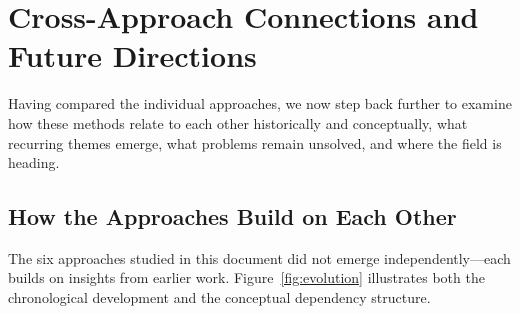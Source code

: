 \chapter{Cross-Approach Connections and Future Directions}
\label{ch:future}

\begin{motivation}
    Having compared the individual approaches, we now step back further
    to examine how these methods relate to each other historically and
    conceptually, what recurring themes emerge, what problems remain
    unsolved, and where the field is heading.
\end{motivation}

\section{How the Approaches Build on Each Other}
\label{sec:evolution}

The six approaches studied in this document did not emerge independently---each
builds on insights from earlier work.
Figure~\ref{fig:evolution} illustrates both the chronological development and
the conceptual dependency structure.

